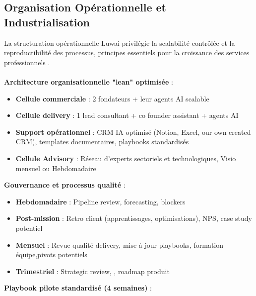 \subsection{Organisation Opérationnelle et Industrialisation}

La structuration opérationnelle Luwai privilégie la scalabilité contrôlée et la reproductibilité des processus, principes essentiels pour la croissance des services professionnels \cite{maister2012managing}.
\\\\
\textbf{Architecture organisationnelle "lean" optimisée} :
\begin{itemize}
    \item \textbf{Cellule commerciale} : 2 fondateurs + leur agents AI scalable 
    \item \textbf{Cellule delivery} : 1 lead consultant + co founder assistant + agents AI
    \item \textbf{Support opérationnel} : CRM IA optimisé (Notion, Excel, our own created CRM), templates documentaires, playbooks standardisés
    \item \textbf{Cellule Advisory} : Réseau d’experts sectoriels et technologiques, Visio mensuel ou Hebdomadaire
\end{itemize}
\medskip
\textbf{Gouvernance et processus qualité} :
\begin{itemize}
    \item \textbf{Hebdomadaire} : Pipeline review, forecasting, blockers
    \item \textbf{Post-mission} : Retro client (apprentissages, optimisations), NPS, case study potentiel
    \item \textbf{Mensuel} : Revue qualité delivery, mise à jour playbooks, formation équipe,pivots potentiels
    \item \textbf{Trimestriel} : Strategic review, , roadmap produit
\end{itemize}
\medskip
\textbf{Playbook pilote standardisé (4 semaines)} :

